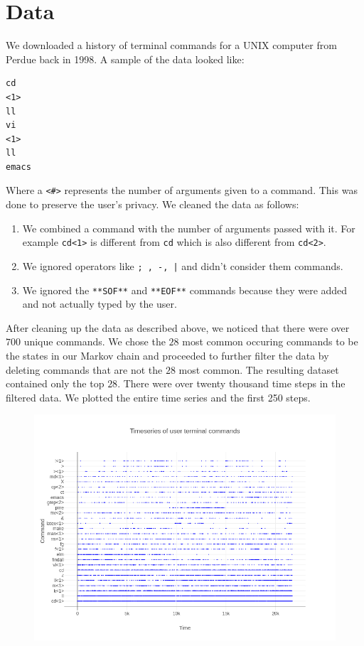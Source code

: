 \documentclass[10pt]{article}
\begin{document}
\section{Data}
We downloaded a history of terminal commands for a UNIX computer from Perdue
back in 1998. A sample of the data looked like:
\begin{verbatim}
cd
<1>
ll
vi
<1>
ll
emacs
\end{verbatim}

Where a \texttt{<\#>} represents the number of arguments given to a command.
This was done to preserve the user's privacy. We cleaned the data as follows:
\begin{enumerate}
  \item We combined a command with the number of arguments passed with it. For
    example \texttt{cd<1>} is different from \texttt{cd} which is also different
    from \texttt{cd<2>}.
  \item We ignored operators like \texttt{; , -, |} and didn't consider them
    commands.
  \item We ignored the \texttt{**SOF**} and \texttt{**EOF**} commands because
    they were added and not actually typed by the user.
\end{enumerate}
After cleaning up the data as described above, we noticed that there were over
$700$ unique commands. We chose the $28$ most common occuring commands to be the
states in our Markov chain and proceeded to further filter the data by deleting
commands that are not the $28$ most common. The resulting dataset contained only
the top $28$. There were over twenty thousand time steps in the filtered data.
We plotted the entire time series and the first 250 steps.

\begin{figure}[ht]
  \centering
  \includegraphics[scale=.65]{../pictures/complete-emperical-timeseries.png}
\end{figure}
\end{document}
